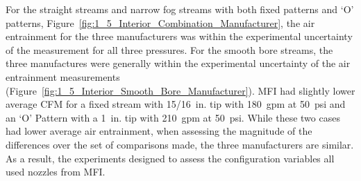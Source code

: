 \documentclass[12pt,oneside]{book}
\begin{document}
For the straight streams and narrow fog streams with both fixed patterns and `O' patterns, Figure~\ref{fig:1_5_Interior_Combination_Manufacturer}, the air entrainment for the three manufacturers was within the experimental uncertainty of the measurement for all three pressures. For the smooth bore streams, the three manufactures were generally within the experimental uncertainty of the air entrainment measurements (Figure~\ref{fig:1_5_Interior_Smooth_Bore_Manufacturer}). MFI had slightly lower average CFM for a fixed stream with 15/16~in. tip with 180~gpm at 50~psi and an `O' Pattern with a 1~in. tip with 210~gpm at 50~psi. While these two cases had lower average air entrainment, when assessing the magnitude of the differences over the set of comparisons made, the three manufacturers are similar. As a result, the experiments designed to assess the configuration variables all used nozzles from MFI. 
\clearpage





\end{document}
